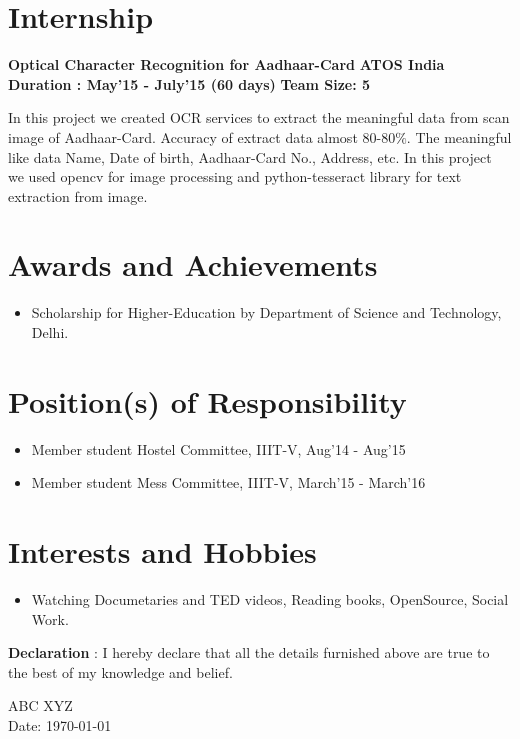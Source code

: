 \documentclass{article}
\begin{document}
\section{Internship}
\textbf{\large{Optical Character Recognition for Aadhaar-Card}} \hspace*{6cm} \textbf{ATOS India}
\textbf{Duration : May'15 - July'15 (60 days)} \hspace*{5.7cm} \textbf{Team Size: 5}

\vspace*{.051mm}
\hspace*{2.6mm} In this project we created OCR services to extract the meaningful data from scan image of Aadhaar-Card. Accuracy of extract data almost 80-80$\%.$ The meaningful like data Name, Date of birth, Aadhaar-Card No., Address, etc. In this project we used opencv for image processing and python-tesseract library for text extraction from image.\\

\vspace*{.4cm}
\section{Awards and Achievements}
\begin{itemize}
\item Scholarship for Higher-Education by Department of Science and Technology, Delhi.
\end{itemize}

\section{Position(s) of Responsibility}
\begin{itemize}
\item Member student Hostel Committee, IIIT-V, Aug'14 - Aug'15
\item Member student Mess Committee, IIIT-V, March'15 - March'16
\end{itemize}
\vspace*{.1cm}
\section{Interests and Hobbies}
\begin{itemize}
\item Watching Documetaries and TED videos, Reading books, OpenSource, Social Work.
\end{itemize}

\vspace*{1cm}
\textbf{Declaration} : I hereby declare that all the details furnished above are true to the best of my knowledge and belief.

\vspace*{1cm}
ABC XYZ \\
Date: \today
\end{document}
